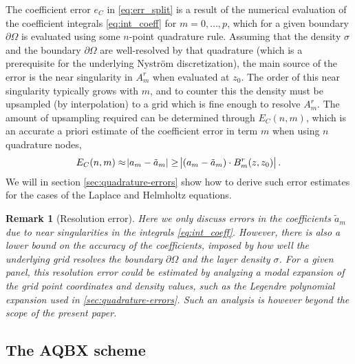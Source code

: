 \documentclass[hidelinks]{siamart1116}
\newtheorem{remark}{Remark}
\begin{document}
The coefficient error $e_C$ in \eqref{eq:err_split} is a result of the
numerical evaluation of the coefficient integrals \eqref{eq:int_coeff}
for $m=0,\dots,p$, which for a given boundary ${{\partial\Omega}}$ is evaluated
using some $n$-point quadrature rule. Assuming that the density ${\sigma}$
and the boundary ${{\partial\Omega}}$ are well-resolved by that quadrature (which is
a prerequisite for the underlying Nystr\"om discretization), the main
source of the error is the near singularity in ${A}_m^r$ when
evaluated at $z_0$. The order of this near singularity typically grows
with $m$, and to counter this the density must be upsampled (by
interpolation) to a grid which is fine enough to resolve
${A}_m^r$. The amount of upsampling required can be determined
through ${E_C}(n, m)$, which is an accurate a priori estimate of the
coefficient error in term $m$ when using $n$ quadrature nodes,
\begin{align}
  {E_C}(n, m) \approx \abs{{a}_m - \tilde{a}_m} \ge 
  \abs{({a}_m - \tilde{a}_m) \cdot {B}_m^r(z, z_0)} .
\end{align}
We will in section \ref{sec:quadrature-errors} show how to derive such
error estimates for the cases of the Laplace and Helmholtz equations.

\begin{remark}[Resolution error]
  Here we only discuss errors in the coefficients $\tilde{a}_m$ due
  to near singularities in the integrals
  \eqref{eq:int_coeff}. However, there is also a lower bound on the
  accuracy of the coefficients, imposed by how well the underlying
  grid resolves the boundary ${{\partial\Omega}}$ and the layer density ${\sigma}$. For
  a given panel, this resolution error could be estimated by analyzing
  a modal expansion of the grid point coordinates and density values,
  such as the Legendre polynomial expansion used in
  \cref{sec:quadrature-errors}. Such an analysis is however beyond the
  scope of the present paper.
\end{remark}

\subsection{The AQBX scheme}
\end{document}
